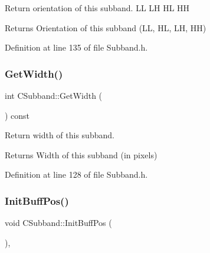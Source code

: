 Return orientation of this subband. LL LH HL HH \begin{DoxyReturn}{Returns}
Orientation of this subband (LL, HL, LH, HH) 
\end{DoxyReturn}


Definition at line 135 of file Subband.\+h.


\begin{DoxyCode}{0}

\end{DoxyCode}
\mbox{\label{classCSubband_a3f53e4fc362e02aa0ff3121485a6c760}} 
\subsubsection{\texorpdfstring{GetWidth()}{GetWidth()}}
{\footnotesize\ttfamily int C\+Subband\+::\+Get\+Width (\begin{DoxyParamCaption}{ }\end{DoxyParamCaption}) const\hspace{0.3cm}{\ttfamily [inline]}}

Return width of this subband. \begin{DoxyReturn}{Returns}
Width of this subband (in pixels) 
\end{DoxyReturn}


Definition at line 128 of file Subband.\+h.


\begin{DoxyCode}{0}

\end{DoxyCode}
\mbox{\label{classCSubband_a1a5bca84a7ceb1ed6dbe417f8d6836ba}} 
\subsubsection{\texorpdfstring{InitBuffPos()}{InitBuffPos()}}
{\footnotesize\ttfamily void C\+Subband\+::\+Init\+Buff\+Pos (\begin{DoxyParamCaption}{ }\end{DoxyParamCaption})\hspace{0.3cm}{\ttfamily [inline]}, {\ttfamily [private]}}



